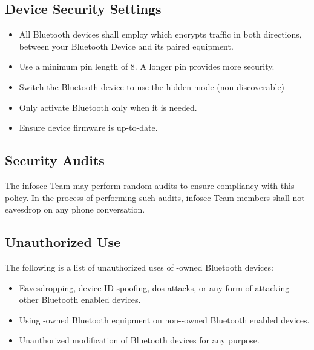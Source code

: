 \subsection{Device Security Settings}
\begin{itemize}
\item
All Bluetooth devices shall employ  which encrypts traffic in both directions, between your Bluetooth Device and its paired equipment.
\item
Use a minimum \gls{pin} length of 8.  
A longer \gls{pin} provides more security.
\item
Switch the Bluetooth device to use the hidden mode (non-discoverable)
\item
Only activate Bluetooth only when it is needed.
\item
Ensure device firmware is up-to-date. 
\end{itemize}
\subsection{Security Audits}
The \gls{infosec} Team may perform random audits to ensure compliancy with this policy.  
In the process of performing such audits, \gls{infosec} Team members shall not eavesdrop on any phone conversation.

\subsection{Unauthorized Use}
The following is a list of unauthorized uses of \CompanyName{}-owned Bluetooth devices:
\begin{itemize}
\item
Eavesdropping, device ID spoofing, \gls{dos} attacks, or any form of attacking other Bluetooth enabled devices.
\item
Using \CompanyName{}-owned Bluetooth equipment on non-\CompanyName{}-owned Bluetooth enabled devices.
\item
Unauthorized modification of Bluetooth devices for any purpose.
\end{itemize}
